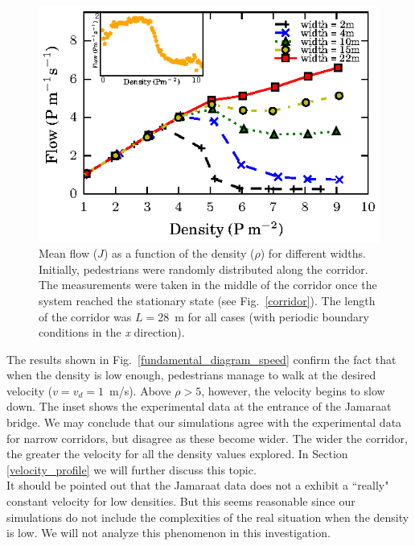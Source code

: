 \begin{figure}[htbp!]
\includegraphics[width=\columnwidth]
{plots/flow-density_vd1_multiple_widths.eps}
\caption{\label{fundamental_diagram_flow} Mean flow ($J$) as a function of the density ($\rho$) for different widths. Initially, 
pedestrians were randomly distributed along the corridor. The measurements were taken in the middle
of the corridor once the system reached the stationary state (see Fig.~\ref{corridor}). The length of the corridor 
was $L=$28~m for all cases (with periodic boundary conditions in the \textit{x} direction).}
\end{figure}

{\color{red} The results shown in Fig.~\ref{fundamental_diagram_speed} confirm the fact that when the density is low enough, pedestrians manage to walk at the desired velocity ($v=v_d=1$~m/s). Above $\rho>5$, however, the velocity begins to slow down. The inset shows the experimental data at the entrance of the Jamaraat bridge. We may conclude that our simulations agree with the experimental data for narrow corridors, but disagree as these become wider. The wider the corridor, the greater the velocity for all the density values explored. In Section \ref{velocity_profile} we will further discuss this topic.\\

It should be pointed out that the Jamaraat data does not a exhibit a ``really" constant velocity for low densities. But this seems reasonable since our simulations do not include the complexities of the real situation when the density is low. We will not analyze this phenomenon in this investigation.} \\

